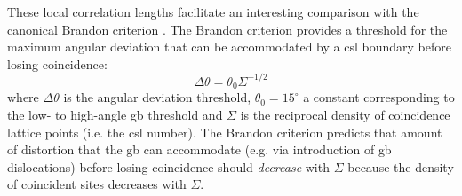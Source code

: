 \documentclass[final,twocolumn,12pt]{elsarticle}
\begin{document}
    
    These local correlation lengths facilitate an interesting comparison with the canonical Brandon criterion \cite{brandonStructureHighangleGrain1966a}. The Brandon criterion provides a threshold for the maximum angular deviation that can be accommodated by a \gls{csl} boundary before losing coincidence:
    \begin{equation}
        \Delta \theta = \theta_0 {\Sigma}^{-1/2}
        \label{eq:brandoncriterion}
    \end{equation}
    where $\Delta \theta$ is the angular deviation threshold, $\theta_0 = 15^{\circ}$ a constant corresponding to the low- to high-angle \gls{gb} threshold and $\Sigma$ is the reciprocal density of coincidence lattice points (i.e. the \gls{csl} number). The Brandon criterion predicts that amount of distortion that the \gls{gb} can accommodate (e.g. via introduction of \gls{gb} dislocations) before losing coincidence should \emph{decrease} with $\Sigma$ because the density of coincident sites decreases with $\Sigma$.
    
\end{document}
